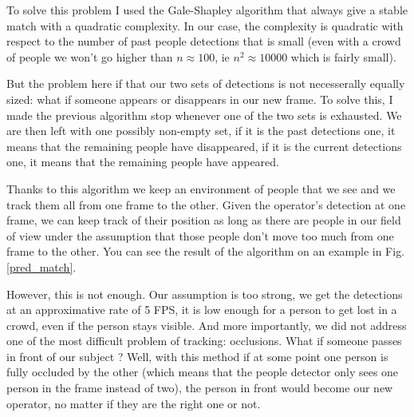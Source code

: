 \documentclass[a4paper, twocolumn]{article}
\begin{document}
    To solve this problem I used the Gale-Shapley algorithm \cite{10.2307/2312726} that always give a stable match with a quadratic complexity. In our case, the complexity is quadratic with respect to the number of past people detections that is small (even with a crowd of people we won't go higher than $n \approx 100$, ie $n^2 \approx 10000$ which is fairly small).

    But the problem here if that our two sets of detections is not necesserally equally sized: what if someone appears or disappears in our new frame. To solve this, I made the previous algorithm stop whenever one of the two sets is exhausted. We are then left with one possibly non-empty set, if it is the past detections one, it means that the remaining people have disappeared, if it is the current detections one, it means that the remaining people have appeared.

    Thanks to this algorithm we keep an environment of people that we see and we track them all from one frame to the other. Given the operator's detection at one frame, we can keep track of their position as long as there are people in our field of view under the assumption that those people don't move too much from one frame to the other. You can see the result of the algorithm on an example in Fig. \ref{pred_match}.

    However, this is not enough. Our assumption is too strong, we get the detections at an approximative rate of 5 FPS, it is low enough for a person to get lost in a crowd, even if the person stays visible. And more importantly, we did not address one of the most difficult problem of tracking: occlusions. What if someone passes in front of our subject ? Well, with this method if at some point one person is fully occluded by the other (which means that the people detector only sees one person in the frame instead of two), the person in front would become our new operator, no matter if they are the right one or not.
\end{document}
